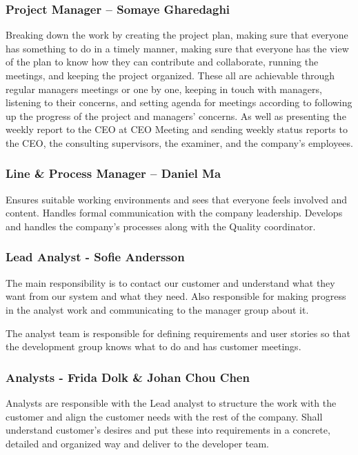 \subsubsection*{Project Manager – Somaye Gharedaghi} 
Breaking down the work by creating the project plan, making sure that everyone has something to do in a timely manner, making sure that everyone has the view of the plan to know how they can contribute and collaborate, running the meetings, and keeping the project organized. These all are achievable through regular managers meetings or one by one, keeping in touch with managers, listening to their concerns, and setting agenda for meetings according to following up the progress of the project and managers' concerns. As well as presenting the weekly report to the CEO at CEO Meeting and sending weekly status reports to the CEO, the consulting supervisors, the examiner, and the company's employees. 

\subsubsection*{Line \& Process Manager – Daniel Ma}
Ensures suitable working environments and sees that everyone feels involved and content. Handles formal communication with the company leadership. Develops and handles the company's processes along with the Quality coordinator.

\subsubsection*{Lead Analyst - Sofie Andersson} 
The main responsibility is to contact our customer and understand what they want from our system and what they need. Also responsible for making progress in the analyst work and communicating to the manager group about it. 

The analyst team is responsible for defining requirements and user stories so that the development group knows what to do and has customer meetings.  

\subsubsection*{Analysts - Frida Dolk \& Johan Chou Chen} 
Analysts are responsible with the Lead analyst to structure the work with the customer and align the customer needs with the rest of the company. Shall understand customer's desires and put these into requirements in a concrete, detailed and organized way and deliver to the developer team. 

